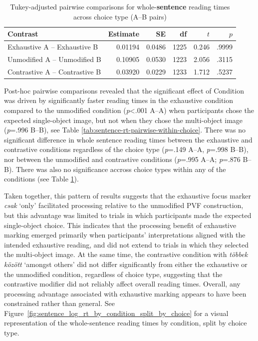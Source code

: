 \documentclass[ruler]{CUP-JNL-LIN}%
\begin{document}
\begin{table}[htbp]
\centering
\caption{Tukey-adjusted pairwise comparisons for whole-\textbf{sentence} reading times across choice type (A--B pairs)}
\label{tab:sentence-rt-pairwise-across-choice}
\begin{tabularx}{\textwidth}{@{}Xrrrrr@{}}
\toprule
Contrast & Estimate & SE & df & $t$ & $p$ \\
\midrule
Exhaustive A -- Exhaustive B   &  0.01194 & 0.0486 & 1225 &  0.246 & .9999 \\
Unmodified A -- Unmodified B   &  0.10905 & 0.0530 & 1223 &  2.056 & .3115 \\
Contrastive A -- Contrastive B &  0.03920 & 0.0229 & 1233 &  1.712 & .5237 \\
\bottomrule
\end{tabularx}
\end{table}



Post-hoc pairwise comparisons revealed that the significant effect of Condition was driven by significantly faster reading times in the exhaustive condition compared to the unmodified condition (\textit{p}<.001 A--A) when participants chose the expected single-object image, but not when they chose the multi-object image (\textit{p}=.996 B--B), see Table \ref{tab:sentence-rt-pairwise-within-choice}. There was no significant difference in whole sentence reading times between the exhaustive and contrastive conditions regardless of the choice type (\textit{p}=.149 A--A, \textit{p}=.998 B--B), nor between the unmodified and contrastive conditions (\textit{p}=.995 A--A; \textit{p}=.876 B--B). There was also no significance accross choice types within any of the conditions (see Table \ref{tab:sentence-rt-pairwise-across-choice}).

Taken together, this pattern of results suggests that the exhaustive focus marker \textit{csak} `only' facilitated processing relative to the unmodified PVF construction, but this advantage was limited to trials in which participants made the expected single-object choice. This indicates that the processing benefit of exhaustive marking emerged primarily when participants’ interpretations aligned with the intended exhaustive reading, and did not extend to trials in which they selected the multi-object image. At the same time, the contrastive condition with \textit{többek között} `amongst others' did not differ significantly from either the exhaustive or the unmodified condition, regardless of choice type, suggesting that the contrastive modifier did not reliably affect overall reading times. Overall, any processing advantage associated with exhaustive marking appears to have been constrained rather than general. See Figure~\ref{fig:sentence_log_rt_by_condition_split_by_choice} for a visual representation of the whole-sentence reading times by condition, split by choice type.
\end{document}
